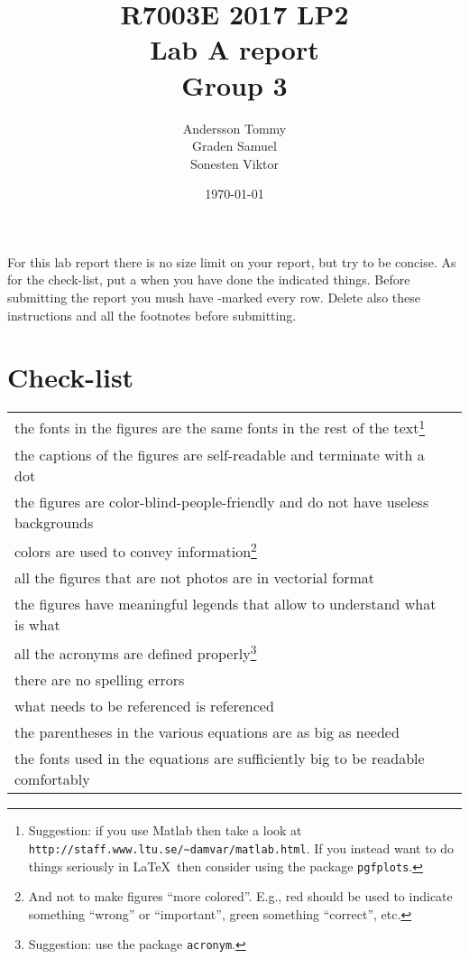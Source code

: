 \documentclass[11pt]{article} %
\title{\Huge R7003E 2017 LP2 \\ Lab A report \\ Group 3}
\date{\today}
\author{                        %
  Andersson Tommy \\
  Graden Samuel \\
  Sonesten Viktor
}
\begin{document}
\maketitle

\begin{instructions}
	For this lab report there is no size limit on your report, but try to be concise. As for the check-list, put a \checkmark when you have done the indicated things. Before submitting the report you mush have \checkmark-marked every row. Delete also these instructions and all the footnotes before submitting.
\end{instructions}

\section*{Check-list}

\begin{center}
	\begin{tabular}{|m{}>{\centering \arraybackslash}m{}|}
		\hline
		the fonts in the figures are the same fonts in the rest of the text\footnote{Suggestion: if you use Matlab then take a look at \texttt{http://staff.www.ltu.se/{\textasciitilde}damvar/matlab.html}. If you instead want to do things seriously in \LaTeX\ then consider using the package \texttt{pgfplots}.} & \\
		the captions of the figures are self-readable and terminate with a dot & \\
		the figures are color-blind-people-friendly and do not have useless backgrounds & \\
		colors are used to convey information\footnote{And not to make figures ``more colored''. E.g., red should be used to indicate something ``wrong'' or ``important'', green something ``correct'', etc.} & \\
		all the figures that are not photos are in vectorial format & \\
		the figures have meaningful legends that allow to understand what is what & \\
		all the acronyms are defined properly\footnote{Suggestion: use the package \texttt{acronym}.} & \\
		there are no spelling errors & \\
		what needs to be referenced is referenced & \\
		the parentheses in the various equations are as big as needed & \\
		the fonts used in the equations are sufficiently big to be readable comfortably & \\
		\hline
	\end{tabular}
\end{center}
\end{document}
